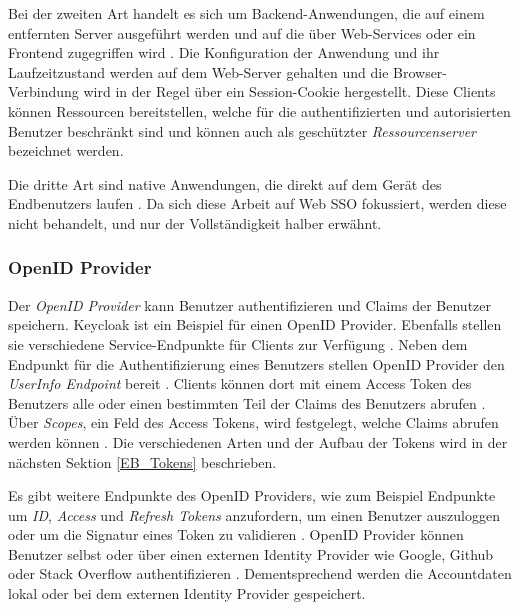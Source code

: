 Bei der zweiten Art handelt es sich um Backend-Anwendungen, die auf einem entfernten Server ausgeführt werden und auf die über Web-Services oder ein Frontend zugegriffen wird \cite{SSEB_OAuth2inAction}. Die Konfiguration der Anwendung und ihr Laufzeitzustand werden auf dem Web-Server gehalten und die Browser-Verbindung wird in der Regel über ein Session-Cookie hergestellt. Diese Clients können Ressourcen bereitstellen, welche für die authentifizierten und autorisierten Benutzer beschränkt sind und können auch als geschützter \textit{Ressourcenserver} bezeichnet werden.

Die dritte Art sind native Anwendungen, die direkt auf dem Gerät des Endbenutzers laufen \cite{SSEB_OAuth2inAction}. Da sich diese Arbeit auf Web SSO fokussiert, werden diese nicht behandelt, und nur der Vollständigkeit halber erwähnt.

\subsubsection{OpenID Provider}

Der \textit{OpenID Provider} kann Benutzer authentifizieren und Claims der Benutzer speichern. Keycloak ist ein Beispiel für einen OpenID Provider. Ebenfalls stellen sie verschiedene Service-Endpunkte für Clients zur Verfügung \cite[Keycloak URI Endpoints]{SSEB_keycloakDocs}. Neben dem Endpunkt für die Authentifizierung eines Benutzers stellen OpenID Provider den \textit{UserInfo Endpoint} bereit \cite[UserInfo Endpoint]{EB4} \cite[Keycloak URI Endpoints]{SSEB_keycloakDocs}. Clients können dort mit einem Access Token des Benutzers alle oder einen bestimmten Teil der Claims des Benutzers abrufen \cite[UserInfo Endpoint]{EB4}. Über \textit{Scopes}, ein Feld des Access Tokens, wird festgelegt, welche Claims abrufen werden können \cite[Requesting Claims]{EB4}. Die verschiedenen Arten und der Aufbau der Tokens wird in der nächsten Sektion \ref{EB_Tokens} beschrieben.

Es gibt weitere Endpunkte des OpenID Providers, wie zum Beispiel Endpunkte um \textit{ID}, \textit{Access} und \textit{Refresh Tokens} anzufordern, um einen Benutzer auszuloggen oder um die Signatur eines Token zu validieren \cite[Keycloak URI Endpoints]{SSEB_keycloakDocs}. OpenID Provider können Benutzer selbst oder über einen externen Identity Provider wie Google, Github oder Stack Overflow authentifizieren \cite{EB7} \cite[Social Identity Providers]{SSEB_keycloakDocs}. Dementsprechend werden die Accountdaten lokal oder bei dem externen Identity Provider gespeichert.

